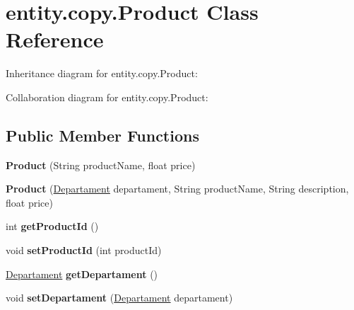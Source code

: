 \hypertarget{classentity_1_1copy_1_1_product}{}\section{entity.\+copy.\+Product Class Reference}
\label{classentity_1_1copy_1_1_product}


Inheritance diagram for entity.\+copy.\+Product\+:


Collaboration diagram for entity.\+copy.\+Product\+:
\subsection*{Public Member Functions}
\begin{DoxyCompactItemize}
\item 
\mbox{\label{classentity_1_1copy_1_1_product_a92a818422328af74cedead5bb76d2312}} 
{\bfseries Product} (String product\+Name, float price)
\item 
\mbox{\label{classentity_1_1copy_1_1_product_a06b960cea288dbf04e271b8b5d39ccc6}} 
{\bfseries Product} (\mbox{\hyperlink{classentity_1_1copy_1_1_departament}{Departament}} departament, String product\+Name, String description, float price)
\item 
\mbox{\label{classentity_1_1copy_1_1_product_a2f8741b135f534044764953684b6b572}} 
int {\bfseries get\+Product\+Id} ()
\item 
\mbox{\label{classentity_1_1copy_1_1_product_a420f74ca7a14413440a9a8f4d2b0a9d3}} 
void {\bfseries set\+Product\+Id} (int product\+Id)
\item 
\mbox{\label{classentity_1_1copy_1_1_product_a4156850c240ef741fbed8fc4644c65ac}} 
\mbox{\hyperlink{classentity_1_1copy_1_1_departament}{Departament}} {\bfseries get\+Departament} ()
\item 
\mbox{\label{classentity_1_1copy_1_1_product_a64b331b630bfb3b18eb90a8e053b3257}} 
void {\bfseries set\+Departament} (\mbox{\hyperlink{classentity_1_1copy_1_1_departament}{Departament}} departament)
\item 

\end{DoxyCompactItemize}

